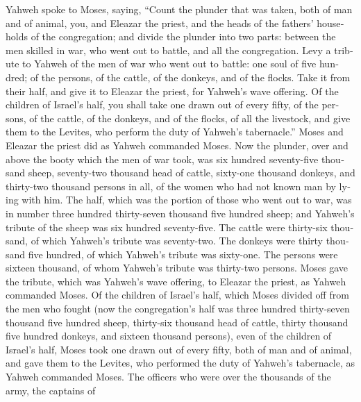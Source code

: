 \begin{paracol}{2}
\begin{otherlanguage}{english}
 Yahweh spoke to Moses, saying,  ``Count
the plunder that was taken, both of man and of animal, you, and Eleazar
the priest, and the heads of the fathers' households of the
congregation;  and divide the plunder into two parts:
between the men skilled in war, who went out to battle, and all the
congregation.  Levy a tribute to Yahweh of the men of war
who went out to battle: one soul of five hundred; of the persons, of the
cattle, of the donkeys, and of the flocks.  Take it from
their half, and give it to Eleazar the priest, for Yahweh's wave
offering.  Of the children of Israel's half, you shall
take one drawn out of every fifty, of the persons, of the cattle, of the
donkeys, and of the flocks, of all the livestock, and give them to the
Levites, who perform the duty of Yahweh's tabernacle.'' 
Moses and Eleazar the priest did as Yahweh commanded Moses.
 Now the plunder, over and above the booty which the men
of war took, was six hundred seventy-five thousand sheep,
 seventy-two thousand head of cattle, 
sixty-one thousand donkeys,  and thirty-two thousand
persons in all, of the women who had not known man by lying with him.
 The half, which was the portion of those who went out to
war, was in number three hundred thirty-seven thousand five hundred
sheep;  and Yahweh's tribute of the sheep was six hundred
seventy-five.  The cattle were thirty-six thousand, of
which Yahweh's tribute was seventy-two.  The donkeys were
thirty thousand five hundred, of which Yahweh's tribute was sixty-one.
 The persons were sixteen thousand, of whom Yahweh's
tribute was thirty-two persons.  Moses gave the tribute,
which was Yahweh's wave offering, to Eleazar the priest, as Yahweh
commanded Moses.  Of the children of Israel's half, which
Moses divided off from the men who fought  (now the
congregation's half was three hundred thirty-seven thousand five hundred
sheep,  thirty-six thousand head of cattle,
 thirty thousand five hundred donkeys, 
and sixteen thousand persons),  even of the children of
Israel's half, Moses took one drawn out of every fifty, both of man and
of animal, and gave them to the Levites, who performed the duty of
Yahweh's tabernacle, as Yahweh commanded Moses.  The
officers who were over the thousands of the army, the captains of

\end{otherlanguage}
\end{paracol}
